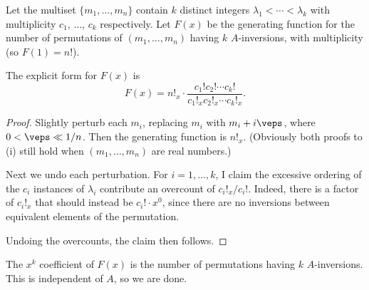 Let the multiset $\{m_1,\ldots,m_n\}$ contain $k$ distinct integers $\lambda_1<\cdots<\lambda_k$ with multiplicity $c_1$, $\ldots$, $c_k$ respectively. Let $F(x)$ be the generating function for the number of permutations of $(m_1,\ldots,m_n)$ having $k$ $A$-inversions, with multiplicity (so $F(1)=n!$).
\begin{claim*}
    The explicit form for $F(x)$ is \[F(x)=n!_x\cdot\frac{c_1!c_2!\cdots c_k!}{c_1!_xc_2!_x\cdots c_k!_x}.\]
\end{claim*}
\begin{proof}
    Slightly perturb each $m_i$, replacing $m_i$ with $m_i+i\veps$, where $0<\veps\ll1/n$. Then the generating function is $n!_x$. (Obviously both proofs to (i) still hold when $(m_1,\ldots,m_n)$ are real numbers.)

    Next we undo each perturbation. For $i=1,\ldots,k$, I claim the excessive ordering of the $c_i$ instances of $\lambda_i$ contribute an overcount of $c_i!_x/c_i!$. Indeed, there is a factor of $c_i!_x$ that should instead be $c_i!\cdot x^0$, since there are no inversions between equivalent elements of the permutation.

    Undoing the overcounts, the claim then follows.
\end{proof}

The $x^k$ coefficient of $F(x)$ is the number of permutations having $k$ $A$-inversions. This is independent of $A$, so we are done.

